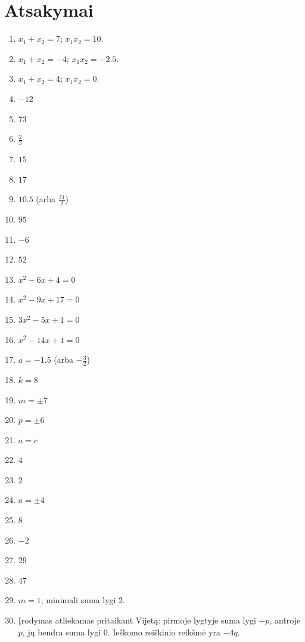 \documentclass[11pt,a4paper]{scrartcl}
\begin{document}
\newpage
\section*{Atsakymai}

\begin{enumerate}
    \item $x_1 + x_2 = 7$; $x_1 x_2 = 10$.
    \item $x_1 + x_2 = -4$; $x_1 x_2 = -2.5$.
    \item $x_1 + x_2 = 4$; $x_1 x_2 = 0$.
    \item $-12$
    \item $73$
    \item $\frac{2}{3}$
    \item $15$
    \item $17$
    \item $10.5$ (arba $\frac{21}{2}$)
    \item $95$
    \item $-6$
    \item $52$
    \item $x^2 - 6x + 4 = 0$
    \item $x^2 - 9x + 17 = 0$
    \item $3x^2 - 5x + 1 = 0$
    \item $x^2 - 14x + 1 = 0$
    \item $a = -1.5$ (arba $-\frac{3}{2}$)
    \item $k = 8$
    \item $m = \pm 7$
    \item $p = \pm 6$
    \item $a = c$
    \item $4$
    \item $2$
    \item $a = \pm 4$
    \item $8$
    \item $-2$
    \item $29$
    \item $47$
    \item $m = 1$; minimali suma lygi $2$.
    \item Įrodymas atliekamas pritaikant Vijetą: pirmoje lygtyje suma lygi $-p$, antroje $p$, jų bendra suma lygi $0$. Ieškomo reiškinio reikšmė yra $-4q$.
\end{enumerate}
\end{document}
